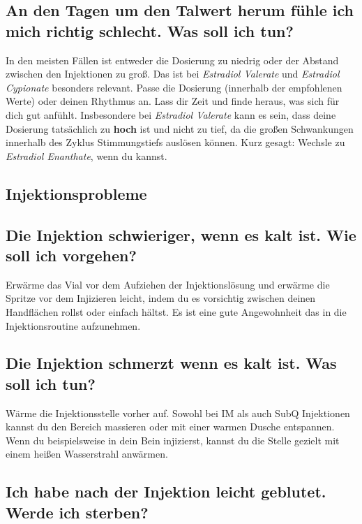 \documentclass{article}
\begin{document}
\subsection{An den Tagen um den Talwert herum fühle ich mich richtig schlecht. Was soll ich tun?}\label{7-3}

In den meisten Fällen ist entweder die Dosierung zu niedrig oder der Abstand zwischen den Injektionen zu groß. Das ist bei \textit{Estradiol Valerate} und \textit{Estradiol Cypionate} besonders relevant. Passe die Dosierung (innerhalb der empfohlenen Werte) oder deinen Rhythmus an. Lass dir Zeit und finde heraus, was sich für dich gut anfühlt. Insbesondere bei \textit{Estradiol Valerate} kann es sein, dass deine Dosierung tatsächlich zu \textbf{hoch} ist und nicht zu tief, da die großen Schwankungen innerhalb des Zyklus Stimmungstiefs auslösen können. Kurz gesagt: Wechsle zu \textit{Estradiol Enanthate}, wenn du kannst.

\subsection*{Injektionsprobleme}

\subsection{Die Injektion schwieriger, wenn es kalt ist. Wie soll ich vorgehen?}

Erwärme das Vial vor dem Aufziehen der Injektionslösung und erwärme die Spritze vor dem Injizieren leicht, indem du es vorsichtig zwischen deinen Handflächen rollst oder einfach hältst. Es ist eine gute Angewohnheit das in die Injektionsroutine aufzunehmen.

\subsection{Die Injektion schmerzt wenn es kalt ist. Was soll ich tun?}

Wärme die Injektionsstelle vorher auf. Sowohl bei IM als auch SubQ Injektionen kannst du den Bereich massieren oder mit einer warmen Dusche entspannen. Wenn du beispielsweise in dein Bein injizierst, kannst du die Stelle gezielt mit einem heißen Wasserstrahl anwärmen.

\subsection{Ich habe nach der Injektion leicht geblutet. Werde ich sterben?}
\end{document}
